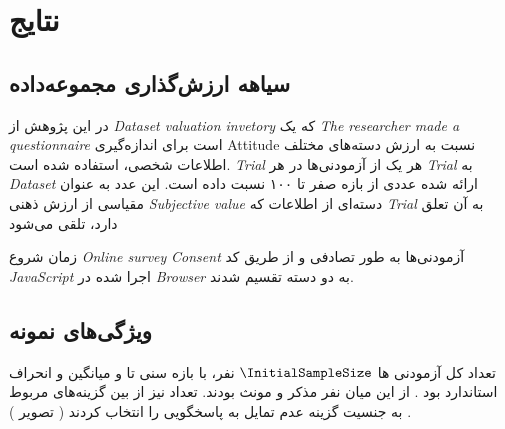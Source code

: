 \chapter{نتایج}
\label{chap:results}

\section{سیاهه ارزش‌گذاری مجموعه‌داده}

در این پژوهش از
{\textit{\gls{Dataset valuation invetory}}}
که یک
{\textit{\gls{The researcher made a questionnaire}}}
است برای اندازه‌گیری
\gls{Attitude}
نسبت به ارزش دسته‌های مختلف اطلاعات شخصی، استفاده شده است.
\textit{\gls{Trial}}
هر یک از آزمودنی‌ها در هر
\textit{\gls{Trial}}
به
\textit{\gls{Dataset}}
ارائه شده عددی از بازه صفر تا ۱۰۰ نسبت داده است. این عدد به عنوان مقیاسی از ارزش ذهنی
\textit{\gls{Subjective value}}
دسته‌ای از اطلاعات که
\textit{\gls{Trial}}
به آن تعلق دارد، تلقی می‌شود

زمان شروع
\textit{\gls{Online survey}}
\textit{\gls{Consent}}
آزمودنی‌ها به طور تصادفی و از طریق کد
\textit{\gls{JavaScript}}
اجرا شده در
\textit{\gls{Browser}}
به دو دسته تقسیم شدند.
\section{ویژگی‌های نمونه}
تعداد کل آزمودنی ها
$\InitialSampleSize$
نفر،
با بازه سنی
\ageMin
تا
\ageMax
و
میانگین
\sampleAgeMean
و انحراف استاندارد
\sampleAgeSD
بود
\!.
از این میان
\SampleSizeMale
نفر مذکر و
\SampleSizeFemale
مونث بودند.
تعداد
\SampleSizeSexualityNoAnswer
نیز از بین گزینه‌های مربوط به جنسیت گزینه عدم تمایل به پاسخگویی را انتخاب کردند
(
تصویر \label{fig:sexualityAgainstPopulation}
)
\!.

